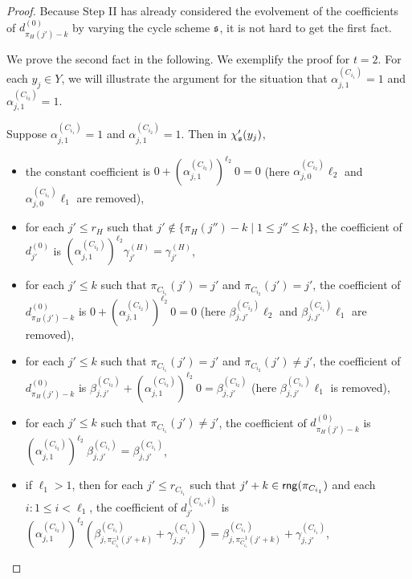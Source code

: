 
\begin{proof}
Because Step II has already considered the evolvement of the coefficients of $d^{(0)}_{\pi_H(j')-k}$ by varying the cycle scheme ${\mathfrak{s} }$, it is not hard to get the first fact.

We prove the second fact in the following. We exemplify the proof for $t=2$. 
For each $y_j \in Y$, we will illustrate the argument for the situation that $\alpha^{(C_{i_1})}_{j,1} = 1$ and $\alpha^{(C_{i_2})}_{j,1} = 1$.

Suppose $\alpha^{(C_{i_1})}_{j,1} = 1$ and $\alpha^{(C_{i_2})}_{j,1} = 1$. Then in $\chi'_{\mathfrak{s} }(y_j)$,
\begin{itemize}
\item the constant coefficient is $0 + (\alpha^{(C_{i_2})}_{j,1})^{\ell_2}\  0 = 0$ (here $\alpha^{(C_{i_2})}_{j,0} \ell_2$ and $\alpha^{(C_{i_1})}_{j,0} \ell_1$ are removed),
%
%
\item for each $j' \le r_{H}$ such that $j' \not \in \{\pi_H(j'')-k \mid 1 \le j'' \le k\}$, the coefficient of $d^{(0)}_{j'}$ is $(\alpha^{(C_{i_2})}_{j,1})^{\ell_2} \gamma^{(H)}_{j'} = \gamma^{(H)}_{j'}$,
%
\item for each $j' \le k$ such that $\pi_{C_{i_1}}(j') = j'$ and $\pi_{C_{i_2}}(j') = j'$, the coefficient of $d^{(0)}_{\pi_H(j')-k}$ is $0 + (\alpha^{(C_{i_2})}_{j,1})^{\ell_2}\ 0 = 0$ (here $\beta^{(C_{i_2})}_{j,j'} \ell_2$ and $\beta^{(C_{i_1})}_{j,j'} \ell_1$ are removed),
%
\item for each $j' \le k$ such that $\pi_{C_{i_1}}(j') = j'$ and $\pi_{C_{i_2}}(j') \neq j'$, the coefficient of $d^{(0)}_{\pi_H(j')-k}$ is $\beta^{(C_{i_2})}_{j,j'} + (\alpha^{(C_{i_2})}_{j,1})^{\ell_2}\ 0 = \beta^{(C_{i_2})}_{j,j'}$ (here $\beta^{(C_{i_1})}_{j,j'} \ell_1$ is removed),
%
\item for each $j' \le k$ such that $\pi_{C_{i_1}}(j') \neq j'$, the coefficient of $d^{(0)}_{\pi_H(j')-k}$ is $(\alpha^{(C_{i_2})}_{j,1})^{\ell_2}\ \beta^{(C_{i_1})}_{j,j'} = \beta^{(C_{i_1})}_{j,j'}$,
%
\item if $\ell_1>1$, then for each $j' \le r_{C_{i_1}}$ such that $j'+k \in \mathsf{rng}(\pi_{C_{i_1}})$ and each $i: 1 \le i < \ell_1$, the coefficient of $d^{(C_{i_1},i)}_{j'}$ is $(\alpha^{(C_{i_2})}_{j,1})^{\ell_2} (\beta^{(C_{i_1})}_{j, \pi^{-1}_{C_{i_1}}(j'+k)}+\gamma^{(C_{i_1})}_{j,j'}) = \beta^{(C_{i_1})}_{j, \pi^{-1}_{C_{i_1}}(j'+k)}+\gamma^{(C_{i_1})}_{j,j'}$,

\end{itemize}
\end{proof}
